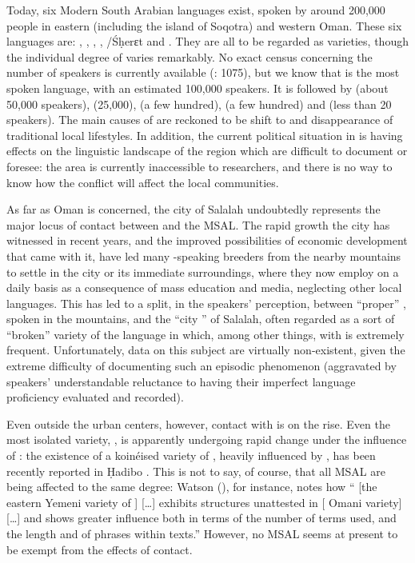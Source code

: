 \documentclass[output=paper]{langsci/langscibook}
\begin{document}
Today, six Modern South Arabian languages exist, spoken by around 200,000 people in eastern  (including the island of Soqotra) and western Oman. These six languages are: , , , , /Śḥerɛt and . They are all to be regarded as  varieties, though the individual degree of  varies remarkably. No exact census concerning the number of speakers is currently available (\citealt{Simeone-Senelle2011}: 1075), but we know that  is the most spoken language, with an estimated 100,000 speakers. It is followed by  (about 50,000 speakers),  (25,000),  (a few hundred),  (a few hundred) and  (less than 20 speakers). The main causes of  are reckoned to be shift to  and disappearance of traditional local lifestyles. In addition, the current political situation in  is having effects on the linguistic landscape of the region which are difficult to document or foresee: the area is currently inaccessible to researchers, and there is no way to know how the conflict will affect the local communities.

As far as Oman is concerned, the city of Salalah undoubtedly represents the major locus of contact between  and the MSAL. The rapid growth the city has witnessed in recent years, and the improved possibilities of economic development that came with it, have led many -speaking breeders from the nearby mountains to settle in the city or its immediate surroundings, where they now employ  on a daily basis as a consequence of mass education and media, neglecting other local languages. This has led to a split, in the speakers’ perception, between ``proper'' , spoken in the mountains, and the ``city '' of Salalah, often regarded as a sort of ``broken'' variety of the language in which, among other things,  with  is extremely frequent. Unfortunately, data on this subject are virtually non-existent, given the extreme difficulty of documenting such an episodic phenomenon (aggravated by speakers’ understandable reluctance to having their imperfect language proficiency evaluated and recorded). 

Even outside the urban centers, however, contact with  is on the rise. Even the most isolated variety, , is apparently undergoing rapid change under the influence of : the existence of a koinéised variety of , heavily influenced by , has been recently reported in Ḥadibo \citep[27]{Morris2017}. This is not to say, of course, that all MSAL are being affected to the same degree: Watson (\citeyear[3]{Watson2012}), for instance, notes how “ [the eastern {Yemeni} variety of ] […] exhibits structures unattested in  [ Omani variety] […] and shows greater  influence both in terms of the number of  terms used, and the length and  of  phrases within texts.” However, no MSAL seems at present to be exempt from the effects of contact.
\end{document}
